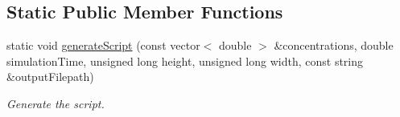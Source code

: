 \subsection*{Static Public Member Functions}
\begin{DoxyCompactItemize}
\item 
static void \hyperlink{classmultiscale_1_1video_1_1RectangularGnuplotScriptGenerator_a8a2e69a85d54df5bacd2e18d27993c14}{generate\-Script} (const vector$<$ double $>$ \&concentrations, double simulation\-Time, unsigned long height, unsigned long width, const string \&output\-Filepath)
\begin{DoxyCompactList}\small\item\em Generate the script. \end{DoxyCompactList}\end{DoxyCompactItemize}
